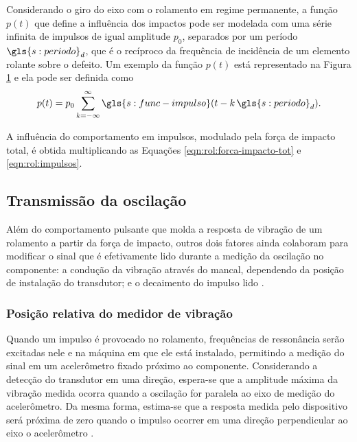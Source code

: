 \documentclass[12pt,oneside,english,brazil,lmodern,siglas,simbolos,cite=num]{ucsmonograph}
\begin{document}
	Considerando o giro do eixo com o rolamento em regime permanente, a função $ p(t) $ que define a influência dos impactos pode ser modelada com uma série infinita de impulsos de igual amplitude $ p_0 $, separados por um período $ \gls{s:periodo}_d $, que é o recíproco da frequência de incidência de um elemento rolante sobre o defeito.
	Um exemplo da função $ p(t) $ está representado na Figura \ref{fig:funcao-impulso} e ela pode ser definida como \cite{mcfadden:1984}
	\begin{equation} \label{eqn:rol:impulsos}
		p(t) = p_0\sum_{k=-\infty}^{\infty}\gls{s:func-impulso}(t-k\,\gls{s:periodo}_d).
	\end{equation}
	
	\begin{figure}[t]
		\label{fig:funcao-impulso}
	\end{figure}

	A influência do comportamento em impulsos, modulado pela força de impacto total, é obtida multiplicando as Equações \ref{eqn:rol:forca-impacto-tot} e \ref{eqn:rol:impulsos}.
	
	\subsection{Transmissão da oscilação}
	Além do comportamento pulsante que molda a resposta de vibração de um rolamento a partir da força de impacto, outros dois fatores ainda colaboram para modificar o sinal que é efetivamente lido durante a medição da oscilação no componente:
	a condução da vibração através do mancal, dependendo da posição de instalação do transdutor; e o decaimento do impulso lido \cite{mcfadden:1984}.
	
	\subsubsection{Posição relativa do medidor de vibração}
	Quando um impulso é provocado no rolamento, frequências de ressonância serão excitadas nele e na máquina em que ele está instalado, permitindo a medição do sinal em um acelerômetro fixado próximo ao componente.
	Considerando a detecção do transdutor em uma direção, espera-se que a amplitude máxima da vibração medida ocorra quando a oscilação for paralela ao eixo de medição do acelerômetro.
	Da mesma forma, estima-se que a resposta medida pelo dispositivo será próxima de zero quando o impulso ocorrer em uma direção perpendicular ao eixo o acelerômetro \cite{mcfadden:1984}.
	
\end{document}
